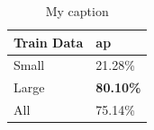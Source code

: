 \begin{table}[h]
\centering
\caption{My caption}
\label{my-label}
\begin{tabular}{|l|l|}
\hline
\textbf{Train Data} & \textbf{\gls{ap}}      \\ \hline
Small      & 21.28\% \\ \hline
Large      & \textbf{80.10\%} \\ \hline
All        & 75.14\% \\ \hline
\end{tabular}
\end{table}









